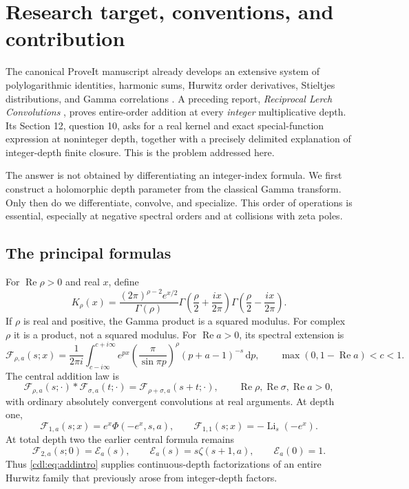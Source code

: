 \documentclass[11pt,letterpaper]{article}
\numberwithin{equation}{section}
\theoremstyle{definition}\newtheorem{definition}[theorem]{Definition}
\theoremstyle{remark}\newtheorem{remark}[theorem]{Remark}
\newcommand{\Rea}{\operatorname{Re}}\newcommand{\Ima}{\operatorname{Im}}
\newcommand{\Li}{\operatorname{Li}}\newcommand{\dd}{\,\mathrm d}
\newcommand{\F}{\mathcal F}\newcommand{\E}{\mathcal E}
\begin{document}
\section{Research target, conventions, and contribution}
\label{cdl:sec:scope}

The canonical ProveIt manuscript already develops an extensive system of
polylogarithmic identities, harmonic sums, Hurwitz order derivatives,
Stieltjes distributions, and Gamma correlations \cite{Repo}. A preceding
report, \emph{Reciprocal Lerch Convolutions} \cite{RLC}, proves entire-order
addition at every \emph{integer} multiplicative depth. Its Section 12,
question 10, asks for a real kernel and exact special-function expression
at noninteger depth, together with a precisely delimited explanation of
integer-depth finite closure. This is the problem addressed here.

The answer is not obtained by differentiating an integer-index formula.
We first construct a holomorphic depth parameter from the classical
Gamma transform. Only then do we differentiate, convolve, and specialize.
This order of operations is essential, especially at negative spectral
orders and at collisions with zeta poles.

\subsection{The principal formulas}
For $\Rea\rho>0$ and real $x$, define
\begin{equation}\label{cdl:eq:K}
 K_\rho(x)=\frac{(2\pi)^{\rho-2}e^{x/2}}{\Gamma(\rho)}
 \Gamma\left(\frac\rho2+\frac{ix}{2\pi}\right)
 \Gamma\left(\frac\rho2-\frac{ix}{2\pi}\right).
\end{equation}
If $\rho$ is real and positive, the Gamma product is a squared modulus.
For complex $\rho$ it is a product, not a squared modulus. For
$\Rea a>0$, its spectral extension is
\begin{equation}\label{cdl:eq:Fintro}
 \F_{\rho,a}(s;x)=\frac1{2\pi i}
 \int_{c-i\infty}^{c+i\infty}e^{px}
 \left(\frac\pi{\sin\pi p}\right)^\rho(p+a-1)^{-s}\dd p,
 \qquad \max(0,1-\Rea a)<c<1.
\end{equation}
The central addition law is
\begin{equation}\label{cdl:eq:addintro}
 \F_{\rho,a}(s;\cdot)*\F_{\sigma,a}(t;\cdot)
 =\F_{\rho+\sigma,a}(s+t;\cdot),
 \qquad \Rea\rho,\Rea\sigma,\Rea a>0,
\end{equation}
with ordinary absolutely convergent convolutions at real arguments.
At depth one,
\begin{equation}\label{cdl:eq:Lerchintro}
 \F_{1,a}(s;x)=e^x\Phi(-e^x,s,a),\qquad
 \F_{1,1}(s;x)=-\Li_s(-e^x).
\end{equation}
At total depth two the earlier central formula remains
\begin{equation}\label{cdl:eq:E}
 \F_{2,a}(s;0)=\E_a(s),\qquad
 \E_a(s)=s\zeta(s+1,a),\qquad \E_a(0)=1.
\end{equation}
Thus \eqref{cdl:eq:addintro} supplies continuous-depth factorizations of
an entire Hurwitz family that previously arose from integer-depth factors.
\end{document}
